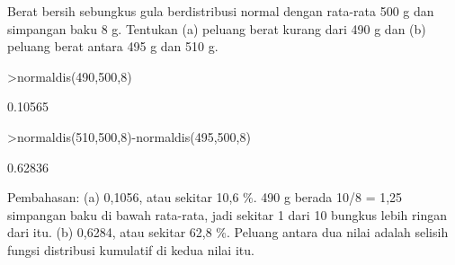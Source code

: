 \documentclass[a4paper,10pt]{article}
\begin{document}
\begin{eulernotebook}
\begin{eulercomment}
\begin{eulercomment}
\begin{eulercomment}
\begin{eulercomment}
\begin{eulercomment}
\begin{eulercomment}
\begin{eulercomment}
\begin{eulercomment}
\begin{eulercomment}
\begin{eulercomment}
\begin{eulercomment}
\begin{eulercomment}
\begin{eulercomment}
\begin{eulercomment}
\begin{eulercomment}
\begin{eulercomment}
\begin{eulercomment}
\begin{eulercomment}
\begin{eulercomment}
\begin{eulercomment}
\begin{eulercomment}
\begin{eulercomment}
\begin{eulercomment}
\begin{eulercomment}
\begin{eulercomment}
\begin{eulercomment}
\begin{eulercomment}
\begin{eulercomment}
\begin{eulercomment}
\begin{eulercomment}
\begin{eulercomment}
\end{eulercomment}
\begin{eulercomment}
Berat bersih sebungkus gula berdistribusi normal dengan rata-rata 500 g dan simpangan baku
8 g. Tentukan (a) peluang berat kurang dari 490 g dan (b) peluang berat antara 495 g dan
510 g.
\end{eulercomment}
\begin{eulerprompt}
>normaldis(490,500,8)
\end{eulerprompt}
\begin{euleroutput}
  0.10565
\end{euleroutput}
\begin{eulerprompt}
>normaldis(510,500,8)-normaldis(495,500,8)
\end{eulerprompt}
\begin{euleroutput}
  0.62836
\end{euleroutput}
\begin{eulercomment}
Pembahasan: (a) 0,1056, atau sekitar 10,6 \%. 490 g berada 10/8 = 1,25 simpangan baku di bawah
rata-rata, jadi sekitar 1 dari 10 bungkus lebih ringan dari itu. (b) 0,6284, atau sekitar
62,8 \%. Peluang antara dua nilai adalah selisih fungsi distribusi kumulatif di kedua nilai
itu.


\end{eulercomment}
\end{eulercomment}
\end{eulercomment}
\end{eulercomment}
\end{eulercomment}
\end{eulercomment}
\end{eulercomment}
\end{eulercomment}
\end{eulercomment}
\end{eulercomment}
\end{eulercomment}
\end{eulercomment}
\end{eulercomment}
\end{eulercomment}
\end{eulercomment}
\end{eulercomment}
\end{eulercomment}
\end{eulercomment}
\end{eulercomment}
\end{eulercomment}
\end{eulercomment}
\end{eulercomment}
\end{eulercomment}
\end{eulercomment}
\end{eulercomment}
\end{eulercomment}
\end{eulercomment}
\end{eulercomment}
\end{eulercomment}
\end{eulercomment}
\end{eulercomment}
\end{eulernotebook}
\end{document}
